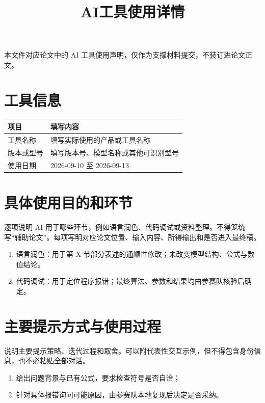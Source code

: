 \documentclass[a4paper,12pt,fontset=fandol]{ctexart}
\title{\heiti\zihao{3} AI工具使用详情}
\author{}
\date{}
\begin{document}
\maketitle
\thispagestyle{fancy}

本文件对应论文中的 AI 工具使用声明，仅作为支撑材料提交，不装订进论文正文。

\section{工具信息}

\begin{tabularx}{\textwidth}{@{}lX@{}}
  \toprule
  项目 & 填写内容 \\
  \midrule
  工具名称 & 填写实际使用的产品或工具名称 \\
  版本或型号 & 填写版本号、模型名称或其他可识别型号 \\
  使用日期 & 2026-09-10 至 2026-09-13 \\
  \bottomrule
\end{tabularx}

\section{具体使用目的和环节}

逐项说明 AI 用于哪些环节，例如语言润色、代码调试或资料整理。不得笼统写“辅助论文”。每项写明对应论文位置、输入内容、所得输出和是否进入最终稿。

\begin{enumerate}
  \item 语言润色：用于第 X 节部分表述的通顺性修改；未改变模型结构、公式与数值结论。
  \item 代码调试：用于定位程序报错；最终算法、参数和结果均由参赛队核验后确定。
\end{enumerate}

\section{主要提示方式与使用过程}

说明主要提示策略、迭代过程和取舍。可以附代表性交互示例，但不得包含身份信息，也不必粘贴全部对话。

\begin{enumerate}
  \item 给出问题背景与已有公式，要求检查符号是否自洽；
  \item 针对具体报错询问可能原因，由参赛队本地复现后决定是否采纳。
\end{enumerate}
\end{document}
